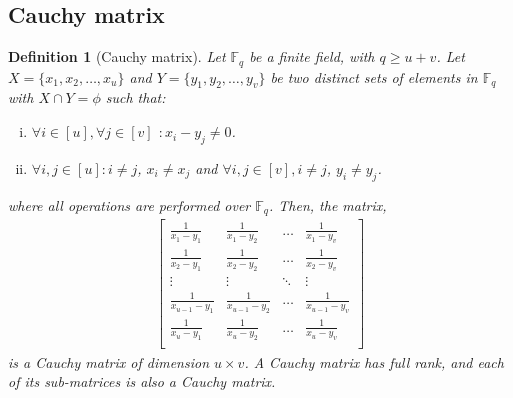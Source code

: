 \documentclass[conference]{IEEEtran}
\newtheorem{defn}{Definition}
\begin{document}
\subsection{Cauchy matrix}
\begin{defn}[Cauchy matrix\cite{Cauchy}]\label{cauchy}
	Let $\mathbb{F}_q$ be a finite field, with $q\geq u+v$. Let $X=\{x_1,x_2,\ldots,x_u\}$ and $Y=\{y_1,y_2,\ldots,y_v\}$ be two distinct sets of elements in $\mathbb{F}_q$ with $X\cap Y=\phi$ such that:
	\begin{enumerate}[i.]
		\item $\forall i\in[u],\forall j\in[v]$ $:x_i-y_j\neq 0$.
		\item $\forall i,j \in [u]: i\neq j$, $x_i\neq x_j$ and $\forall i,j\in [v], i\neq j$, $y_i\neq y_j$.
	\end{enumerate}
	where all operations are performed over $\mathbb{F}_q$. Then, the matrix,
	\begin{align}
	\begin{bmatrix}
	\frac{1}{x_1-y_1} & \frac{1}{x_1-y_2} & \ldots & \frac{1}{x_1-y_v}\\
	\frac{1}{x_2-y_1} & \frac{1}{x_2-y_2} & \ldots & \frac{1}{x_2-y_v}\\
	\vdots &\vdots & \ddots &\vdots\\
	\frac{1}{x_{u-1}-y_1} & \frac{1}{x_{u-1}-y_2} & \ldots & \frac{1}{x_{u-1}-y_v}\\
	\frac{1}{x_u-y_1} & \frac{1}{x_u-y_2} & \ldots & \frac{1}{x_u-y_v}\\
	\end{bmatrix}
	\end{align} is a Cauchy matrix of dimension $u\times v$. A Cauchy matrix has full rank, and each of its sub-matrices is also a Cauchy matrix. 
\end{defn}

\end{document}
